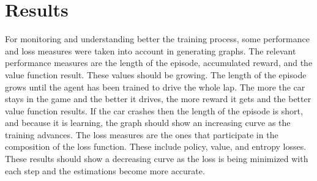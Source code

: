 \chapter{Results}
For monitoring and understanding better the training process, some performance and loss measures were taken into account in generating graphs. The relevant performance measures are the length of the episode, accumulated reward, and the value function result. These values should be growing. The length of the episode grows until the agent has been trained to drive the whole lap. The more the car stays in the game and the better it drives, the more reward it gets and the better value function results. If the car crashes then the length of the episode is short, and because it is learning, the graph should show an increasing curve as the training advances. The loss measures are the ones that participate in the composition of the loss function. These include policy, value, and entropy losses. These results should show a decreasing curve as the loss is being minimized with each step and the estimations become more accurate.

